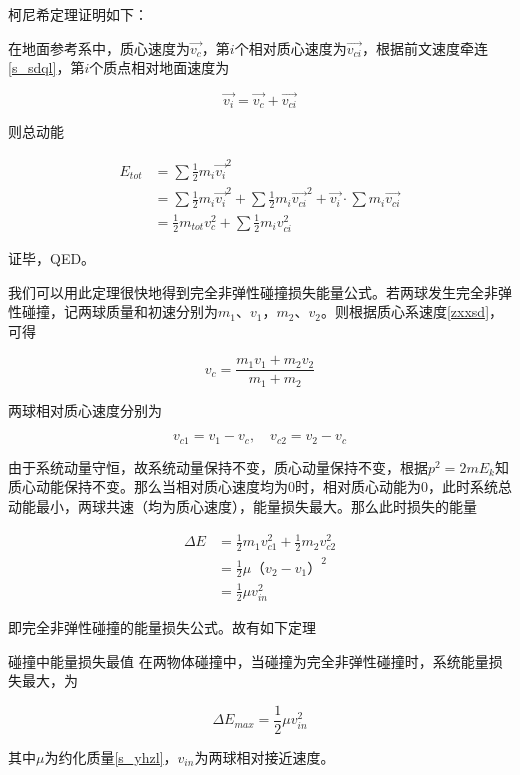 柯尼希定理证明如下：

在地面参考系中，质心速度为$\vec{v_c}$，第$i$个相对质心速度为$\vec{v_{ci}}$，根据前文速度牵连\eqref{s_sdql}，第$i$个质点相对地面速度为

$$\vec{v_i} = \vec{v_c} + \vec{v_{ci}}$$

则总动能

\begin{subequations}
\begin{align*}
E_{tot} &= \sum \frac{1}{2} m_i \vec{v_i}^2 \\
&= \sum \frac{1}{2} m_i \vec{v_i}^2 + \sum \frac{1}{2} m_i \vec{v_{ci}}^2 + \vec{v_i} \cdot \sum m_i \vec{v_{ci}} \\
&= \frac{1}{2} m_{tot} v_c^2 + \sum \frac{1}{2} m_i v_{ci}^2
\end{align*}
\end{subequations}

证毕，QED。 

我们可以用此定理很快地得到完全非弹性碰撞损失能量公式。若两球发生完全非弹性碰撞，记两球质量和初速分别为$m_1$、$v_1$，$m_2$、$v_2$。则根据质心系速度\eqref{zxxsd}，可得

$$v_c = \frac{m_1 v_1 + m_2 v_2}{m_1+m_2}$$

两球相对质心速度分别为

$$v_{c1} = v_1 - v_c ,\quad v_{c2} = v_2 - v_c$$

由于系统动量守恒，故系统动量保持不变，质心动量保持不变，根据$p^2 = 2 m E_k$知质心动能保持不变。那么当相对质心速度均为$0$时，相对质心动能为$0$，此时系统总动能最小，两球共速（均为质心速度），能量损失最大。那么此时损失的能量

\begin{subequations}
\begin{align*}
\Delta E &= \frac{1}{2} m_1 v_{c1}^2 + \frac{1}{2} m_2 v_{c2}^2 \\
&= \frac{1}{2} \mu （v_2 - v_1）^2 \\
&= \frac{1}{2} \mu v_{in}^2
\end{align*}
\end{subequations}

即完全非弹性碰撞的能量损失公式。故有如下定理

\begin{theo}{碰撞中能量损失最值}{}
在两物体碰撞中，当碰撞为完全非弹性碰撞时，系统能量损失最大，为

$$\Delta E_{max} = \frac{1}{2} \mu v_{in}^2$$

其中$\mu$为约化质量\eqref{s_yhzl}，$v_{in}$为两球相对接近速度。
\end{theo}

